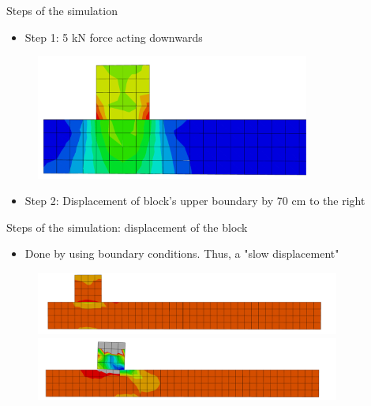 \documentclass{beamer}
\begin{document}
\begin{frame}{Steps of the simulation}

\begin{itemize}
\item Step 1: 5 kN force acting downwards
\end{itemize}

\begin{figure}
\includegraphics[width=9cm]{mises.pdf}
\end{figure}

\begin{itemize}
\item Step 2: Displacement of block's upper boundary by 70 cm to the right
\end{itemize}

\end{frame}

\begin{frame}{Steps of the simulation: displacement of the block}

\begin{itemize}
\item Done by using boundary conditions. Thus, a "slow displacement"
\end{itemize}

\begin{figure}
\includegraphics[width=10cm]{anim1.pdf}\\
\includegraphics[width=10cm]{anim2.pdf}
\end{figure}

\end{frame}
\end{document}
